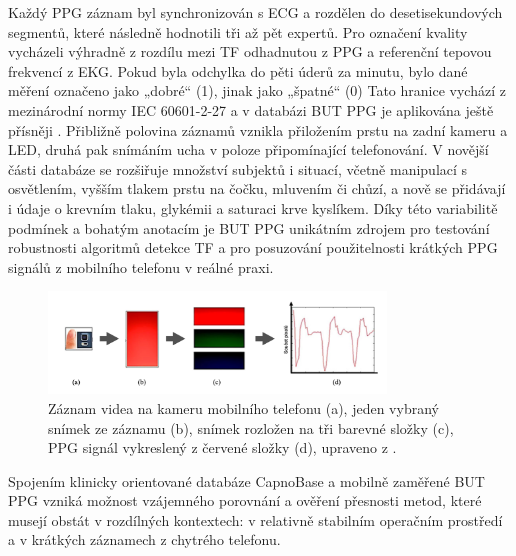 Každý \acs{PPG} záznam byl synchronizován s ECG a rozdělen do desetisekundových segmentů, které následně hodnotili tři až pět expertů.
Pro označení kvality vycházeli výhradně z rozdílu mezi \acs{TF} odhadnutou z \acs{PPG} a referenční tepovou frekvencí z EKG.
Pokud byla odchylka do pěti úderů za minutu, bylo dané měření označeno jako „dobré“ (1), jinak jako „špatné“ (0)
Tato hranice vychází z mezinárodní normy IEC 60601-2-27 a v databázi \acs{BUT PPG} je aplikována ještě přísněji \cite{BUT_PPG}.
Přibližně polovina záznamů vznikla přiložením prstu na zadní kameru a LED, druhá pak snímáním ucha v poloze připomínající telefonování.
V novější části databáze se rozšiřuje množství subjektů i situací, včetně manipulací s osvětlením, vyšším tlakem prstu na čočku, mluvením či chůzí, a nově se přidávají i údaje o krevním tlaku, glykémii a saturaci krve kyslíkem.
Díky této variabilitě podmínek a bohatým anotacím je \acs{BUT PPG} unikátním zdrojem pro testování robustnosti algoritmů detekce \acs{TF} a pro posuzování použitelnosti krátkých PPG signálů z mobilního telefonu v reálné praxi.

\begin{figure}[ht]
	\centering
	\includegraphics[width=0.8\textwidth]{./obrazky/videoZaznamPPG.png}
	\caption[Získání PPG signálu pro databázi \acs{BUT PPG}]{Záznam videa na kameru mobilního telefonu (a), jeden vybraný snímek ze záznamu (b), snímek rozložen na tři barevné složky (c), PPG signál vykreslený z červené složky (d), upraveno z \cite{Siddiqui2016}.}
	\label{fig:videoZaznamPPG}
\end{figure}

Spojením klinicky orientované databáze CapnoBase a mobilně zaměřené \acs{BUT PPG} vzniká možnost vzájemného porovnání a ověření přesnosti metod,
které musejí obstát v rozdílných kontextech: v relativně stabilním operačním prostředí a v krátkých záznamech z chytrého telefonu.